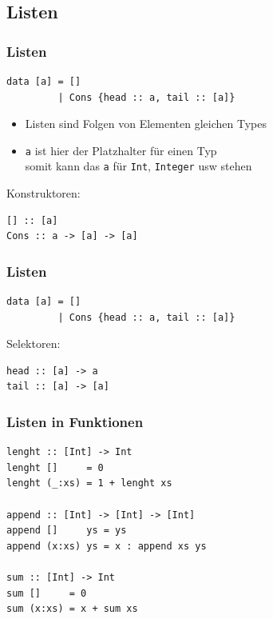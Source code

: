 \subsection{Listen}
\begin{frame}[fragile]
\frametitle{Listen}
\begin{lstlisting}
data [a] = []
         | Cons {head :: a, tail :: [a]}
\end{lstlisting}
\begin{block}{\vspace*{-3ex}}
\begin{itemize}
  \item Listen sind Folgen von Elementen gleichen Types
  \item \lstinline|a| ist hier der Platzhalter für einen Typ\\
  		somit kann das \lstinline|a| für \lstinline|Int|, \lstinline|Integer| usw stehen
\end{itemize}
\end{block}  		
Konstruktoren: 
\pause
\begin{lstlisting}
[] :: [a]
Cons :: a -> [a] -> [a]
\end{lstlisting}
\end{frame}

\begin{frame}[fragile]
\frametitle{Listen}
\begin{lstlisting}
data [a] = []
         | Cons {head :: a, tail :: [a]}
\end{lstlisting}
Selektoren: 
\pause
\begin{lstlisting}
head :: [a] -> a
tail :: [a] -> [a]
\end{lstlisting}
\end{frame}

\begin{frame}[fragile]
\frametitle{Listen in Funktionen}
\begin{lstlisting}
lenght :: [Int] -> Int
lenght []     = 0
lenght (_:xs) = 1 + lenght xs

append :: [Int] -> [Int] -> [Int]
append []     ys = ys
append (x:xs) ys = x : append xs ys

sum :: [Int] -> Int
sum []     = 0
sum (x:xs) = x + sum xs
\end{lstlisting}
\end{frame}

